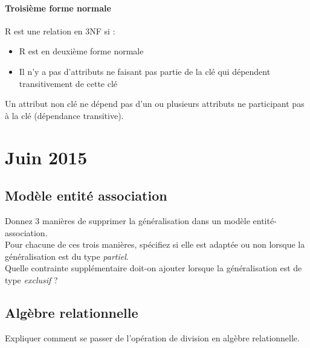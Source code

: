 \paragraph{Troisième forme normale}
R est une relation en 3NF si : 
\begin{itemize}
	\item R est en deuxième forme normale
	\item Il n'y a pas d'attributs ne faisant pas partie de la clé qui dépendent 
	transitivement de cette clé
\end{itemize}

Un attribut non clé ne dépend pas d'un ou plusieurs attributs ne participant pas à la clé (dépendance transitive).

\section{Juin 2015}

\subsection{Modèle entité association}

Donnez 3 manières de supprimer la généralisation dans un modèle entité-association.\\
Pour chacune de ces trois manières, spécifiez si elle est adaptée ou non lorsque la 
généralisation est du type \textit{partiel}.\\
Quelle contrainte supplémentaire doit-on ajouter lorsque la généralisation est 
de type \textit{exclusif} ?

\subsection{Algèbre relationnelle}
Expliquer comment se passer de l'opération de division en algèbre relationnelle.


